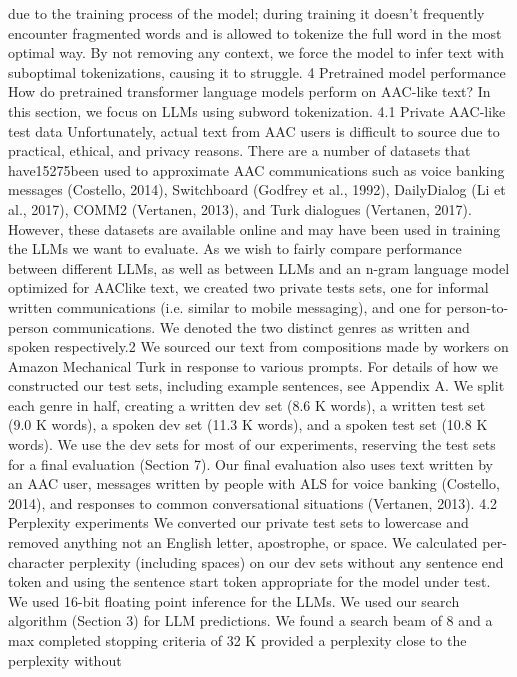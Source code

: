 due to the training process of the model; during
training it doesn’t frequently encounter fragmented
words and is allowed to tokenize the full word in the
most optimal way. By not removing any context,
we force the model to infer text with suboptimal
tokenizations, causing it to struggle.
4 Pretrained model performance
How do pretrained transformer language models
perform on AAC-like text? In this section, we
focus on LLMs using subword tokenization.
4.1 Private AAC-like test data
Unfortunately, actual text from AAC users is difficult to source due to practical, ethical, and privacy
reasons. There are a number of datasets that have15275been used to approximate AAC communications
such as voice banking messages (Costello, 2014),
Switchboard (Godfrey et al., 1992), DailyDialog
(Li et al., 2017), COMM2 (Vertanen, 2013), and
Turk dialogues (Vertanen, 2017). However, these
datasets are available online and may have been
used in training the LLMs we want to evaluate.
As we wish to fairly compare performance between different LLMs, as well as between LLMs
and an n-gram language model optimized for AAClike text, we created two private tests sets, one for
informal written communications (i.e. similar to
mobile messaging), and one for person-to-person
communications. We denoted the two distinct genres as written and spoken respectively.2 We sourced
our text from compositions made by workers on
Amazon Mechanical Turk in response to various
prompts. For details of how we constructed our test
sets, including example sentences, see Appendix A.
We split each genre in half, creating a written dev
set (8.6 K words), a written test set (9.0 K words),
a spoken dev set (11.3 K words), and a spoken test
set (10.8 K words). We use the dev sets for most of
our experiments, reserving the test sets for a final
evaluation (Section 7). Our final evaluation also
uses text written by an AAC user, messages written
by people with ALS for voice banking (Costello,
2014), and responses to common conversational
situations (Vertanen, 2013).
4.2 Perplexity experiments
We converted our private test sets to lowercase and
removed anything not an English letter, apostrophe,
or space. We calculated per-character perplexity
(including spaces) on our dev sets without any sentence end token and using the sentence start token
appropriate for the model under test.
We used 16-bit floating point inference for the
LLMs. We used our search algorithm (Section 3)
for LLM predictions. We found a search beam of 8
and a max completed stopping criteria of 32 K provided a perplexity close to the perplexity without
